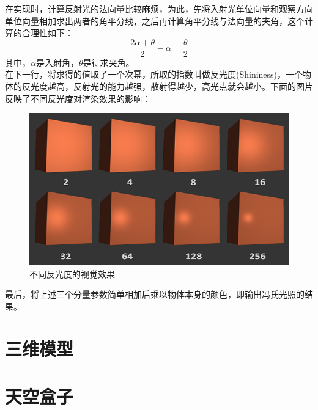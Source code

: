 \begin{spacing}{2.5}
    在实现时，计算反射光的法向量比较麻烦，为此，先将入射光单位向量和观察方向单位向量相加求出两者的角平分线，之后再计算角平分线与法向量的夹角，这个计算的合理性如下：
   		\begin{equation}
   			\frac{2\alpha+\theta}{2} - \alpha = \frac{\theta}{2}
   		\end{equation}
    其中，$\alpha$是入射角，$\theta$是待求夹角。\\
    在下一行，将求得的值取了一个次幂，所取的指数叫做反光度(Shininess)，一个物体的反光度越高，反射光的能力越强，散射得越少，高光点就会越小。下面的图片反映了不同反光度对渲染效果的影响：
    
    \begin{figure}[H]
    	\centering
		\includegraphics[width=1.0\textwidth]{images/shininess.png}
		\caption{不同反光度的视觉效果}
		\label{shininess}
    \end{figure}
    
    最后，将上述三个分量参数简单相加后乘以物体本身的颜色，即输出冯氏光照的结果。
    	
    \end{spacing}
  

    \section{三维模型}
    
    \section{天空盒子}
    
    
    

